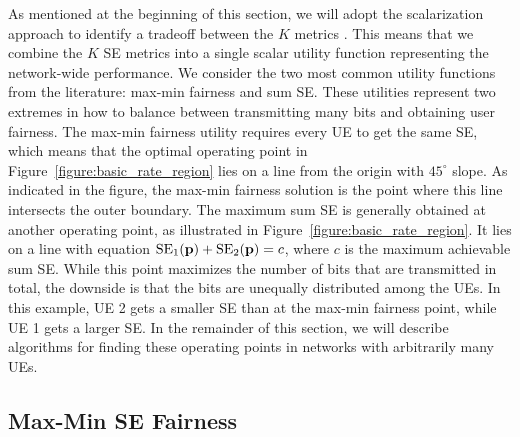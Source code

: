 As mentioned at the beginning of this section, we will adopt the scalarization approach to identify a tradeoff between the $K$ metrics \cite{Bjornson2014c}. This means that we combine the  $K$ SE metrics into a single scalar utility function representing the network-wide performance. We consider the two most common utility functions from the literature: max-min fairness and sum SE. These utilities represent two extremes in how to balance between transmitting many bits and obtaining user fairness.
The max-min fairness utility requires every UE to get the same SE, which means that the optimal operating point in Figure~\ref{figure:basic_rate_region} lies on a line from the origin with $45^\circ$ slope. As indicated in the figure, the max-min fairness solution is the point where this line intersects the outer boundary.
The maximum sum SE is generally obtained at another operating point, as illustrated in Figure~\ref{figure:basic_rate_region}. It lies on a line with equation $\mathrm{SE}_1(\mathbf{p})+\mathrm{SE}_2(\mathbf{p})=c$, where $c$ is the maximum achievable sum SE. While this point maximizes the number of bits that are transmitted in total, the downside is that the bits are unequally distributed among the UEs. In this example, UE 2 gets a smaller SE than at the max-min fairness point, while UE 1 gets a larger SE. In the remainder of this section, we will describe algorithms for finding these operating points in networks with arbitrarily many UEs.


\subsection{Max-Min SE Fairness}

